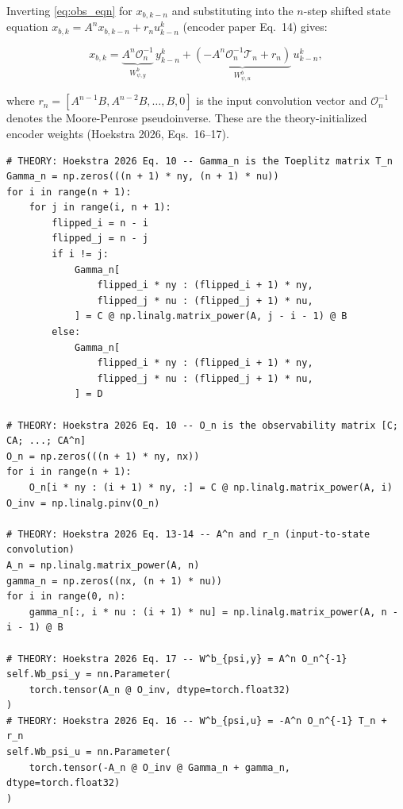 \documentclass[11pt,a4paper]{article}
\newcommand{\codetitle}[2]{\small\texttt{#1}\quad lines #2}
\begin{document}
Inverting \eqref{eq:obs_eqn} for $x_{b,k-n}$ and substituting into
the $n$-step shifted state equation
$x_{b,k} = A^n x_{b,k-n} + r_n u_{k-n}^k$
(encoder paper Eq.\ 14) gives:

\begin{equation}
  x_{b,k} = \underbrace{A^n \mathcal{O}_n^{-1}}_{W_{\psi,y}^b}\, y_{k-n}^{k}
           + \underbrace{\left(-A^n \mathcal{O}_n^{-1} \mathcal{T}_n + r_n\right)}_{W_{\psi,u}^b}\,
             u_{k-n}^k,
  \label{eq:reconstruct}
\end{equation}

where $r_n = [A^{n-1}B, A^{n-2}B, \ldots, B, 0]$ is the input convolution
vector and $\mathcal{O}_n^{-1}$ denotes the Moore-Penrose pseudoinverse.
These are the theory-initialized encoder weights (Hoekstra 2026,
Eqs.\ 16--17).

\begin{lstlisting}[style=py,
  title={\codetitle{model\_augmentation/fit\_systems/pre\_encoder.py}{359--394} -- \texttt{linear\_encoder\_init\_aug.\_\_init\_\_()}},
  firstnumber=359]
# THEORY: Hoekstra 2026 Eq. 10 -- Gamma_n is the Toeplitz matrix T_n
Gamma_n = np.zeros(((n + 1) * ny, (n + 1) * nu))
for i in range(n + 1):
    for j in range(i, n + 1):
        flipped_i = n - i
        flipped_j = n - j
        if i != j:
            Gamma_n[
                flipped_i * ny : (flipped_i + 1) * ny,
                flipped_j * nu : (flipped_j + 1) * nu,
            ] = C @ np.linalg.matrix_power(A, j - i - 1) @ B
        else:
            Gamma_n[
                flipped_i * ny : (flipped_i + 1) * ny,
                flipped_j * nu : (flipped_j + 1) * nu,
            ] = D

# THEORY: Hoekstra 2026 Eq. 10 -- O_n is the observability matrix [C; CA; ...; CA^n]
O_n = np.zeros(((n + 1) * ny, nx))
for i in range(n + 1):
    O_n[i * ny : (i + 1) * ny, :] = C @ np.linalg.matrix_power(A, i)
O_inv = np.linalg.pinv(O_n)

# THEORY: Hoekstra 2026 Eq. 13-14 -- A^n and r_n (input-to-state convolution)
A_n = np.linalg.matrix_power(A, n)
gamma_n = np.zeros((nx, (n + 1) * nu))
for i in range(0, n):
    gamma_n[:, i * nu : (i + 1) * nu] = np.linalg.matrix_power(A, n - i - 1) @ B

# THEORY: Hoekstra 2026 Eq. 17 -- W^b_{psi,y} = A^n O_n^{-1}
self.Wb_psi_y = nn.Parameter(
    torch.tensor(A_n @ O_inv, dtype=torch.float32)
)
# THEORY: Hoekstra 2026 Eq. 16 -- W^b_{psi,u} = -A^n O_n^{-1} T_n + r_n
self.Wb_psi_u = nn.Parameter(
    torch.tensor(-A_n @ O_inv @ Gamma_n + gamma_n, dtype=torch.float32)
)
\end{lstlisting}
\end{document}
